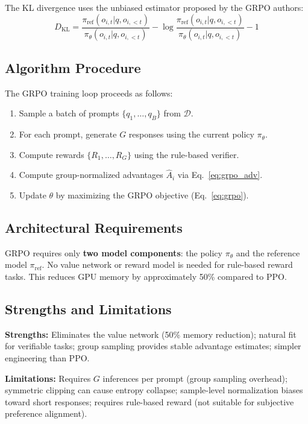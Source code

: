 The KL divergence uses the unbiased estimator proposed by the GRPO authors:
\begin{equation}
D_{\text{KL}} = \frac{\pi_{\text{ref}}(o_{i,t}|q, o_{i,<t})}{\pi_\theta(o_{i,t}|q, o_{i,<t})} - \log\frac{\pi_{\text{ref}}(o_{i,t}|q, o_{i,<t})}{\pi_\theta(o_{i,t}|q, o_{i,<t})} - 1
\end{equation}

\subsection{Algorithm Procedure}

The GRPO training loop proceeds as follows:
\begin{enumerate}[leftmargin=*, itemsep=1pt]
\item Sample a batch of prompts $\{q_1, \ldots, q_B\}$ from $\mathcal{D}$.
\item For each prompt, generate $G$ responses using the current policy $\pi_\theta$.
\item Compute rewards $\{R_1, \ldots, R_G\}$ using the rule-based verifier.
\item Compute group-normalized advantages $\hat{A}_i$ via Eq.~\ref{eq:grpo_adv}.
\item Update $\theta$ by maximizing the GRPO objective (Eq.~\ref{eq:grpo}).
\end{enumerate}

\subsection{Architectural Requirements}

GRPO requires only \textbf{two model components}: the policy $\pi_\theta$ and the reference model $\pi_{\text{ref}}$. No value network or reward model is needed for rule-based reward tasks. This reduces GPU memory by approximately 50\% compared to PPO.

\subsection{Strengths and Limitations}

\textbf{Strengths:} Eliminates the value network (50\% memory reduction); natural fit for verifiable tasks; group sampling provides stable advantage estimates; simpler engineering than PPO.

\textbf{Limitations:} Requires $G$ inferences per prompt (group sampling overhead); symmetric clipping can cause entropy collapse; sample-level normalization biases toward short responses; requires rule-based reward (not suitable for subjective preference alignment).
